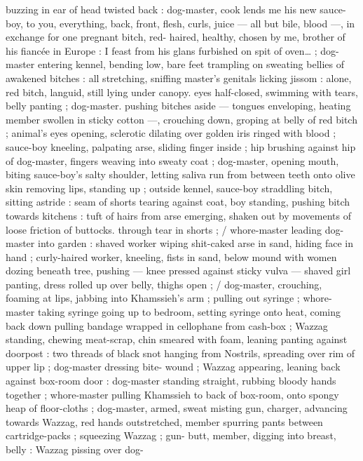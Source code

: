 buzzing in ear of head twisted back : {\gl}{\td} dog-master, cook lends me 
his new sauce-boy, to you, everything, back, front, flesh, curls, juice 
--- all but bile, blood ---, in exchange for one pregnant bitch, red- 
haired, healthy, chosen by me, brother of his fiancée in Europe : I 
feast from his glans furbished on spit of oven{\ldots} {\gr} ; dog-master 
entering kennel, bending low, bare feet trampling on sweating bellies 
of awakened bitches : all stretching, sniffing master's genitals 
licking jissom : alone, red bitch, languid, still lying under canopy. 
eyes half-closed, swimming with tears, belly panting ; dog-master. 
pushing bitches aside --- tongues enveloping, heating member 
swollen in sticky cotton ---, crouching down, groping at belly of red 
bitch ; animal's eyes opening, sclerotic dilating over golden iris 
ringed with blood ; sauce-boy kneeling, palpating arse, sliding finger 
inside ; hip brushing against hip of dog-master, fingers weaving into 
sweaty coat ; dog-master, opening mouth, biting sauce-boy's salty 
shoulder, letting saliva run from between teeth onto olive skin 
removing lips, standing up ; outside kennel, sauce-boy straddling 
bitch, sitting astride : seam of shorts tearing against coat, boy 
standing, pushing bitch towards kitchens : tuft of hairs from arse 
emerging, shaken out by movements of loose friction of buttocks. 
through tear in shorts ; {\slash} whore-master leading dog-master into 
garden : shaved worker wiping shit-caked arse in sand, hiding face 
in hand ; curly-haired worker, kneeling, fists in sand, below mound 
with women dozing beneath tree, pushing --- knee pressed against 
sticky vulva --- shaved girl panting, dress rolled up over belly, thighs 
open ; {\slash} dog-master, crouching, foaming at lips, jabbing into 
Khamssieh's arm ; pulling out syringe ; whore-master taking syringe 
going up to bedroom, setting syringe onto heat, coming back down 
pulling bandage wrapped in cellophane from cash-box ; Wazzag 
standing, chewing meat-scrap, chin smeared with foam, leaning 
panting against doorpost : two threads of black snot hanging from 
Nostrils, spreading over rim of upper lip ; dog-master dressing bite- 
wound ; Wazzag appearing, leaning back against box-room door : 
dog-master standing straight, rubbing bloody hands together ; 
whore-master pulling Khamssieh to back of box-room, onto spongy 
heap of floor-cloths ; dog-master, armed, sweat misting gun, charger, 
advancing towards Wazzag, red hands outstretched, member 
spurring pants between cartridge-packs ; squeezing Wazzag ; gun- 
butt, member, digging into breast, belly : Wazzag pissing over dog- 
